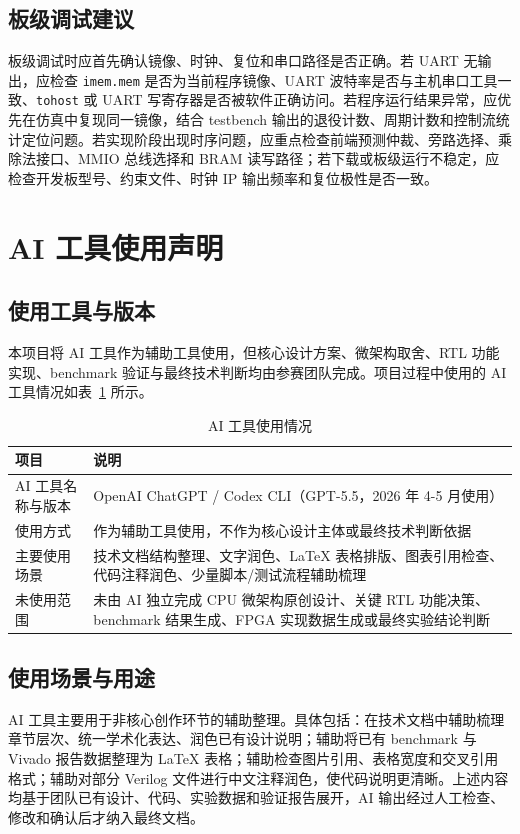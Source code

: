 ﻿\documentclass[12pt,a4paper]{ctexart}
\begin{document}
\subsection{板级调试建议}
板级调试时应首先确认镜像、时钟、复位和串口路径是否正确。若 UART 无输出，应检查 \texttt{imem.mem} 是否为当前程序镜像、UART 波特率是否与主机串口工具一致、\texttt{tohost} 或 UART 写寄存器是否被软件正确访问。若程序运行结果异常，应优先在仿真中复现同一镜像，结合 testbench 输出的退役计数、周期计数和控制流统计定位问题。若实现阶段出现时序问题，应重点检查前端预测仲裁、旁路选择、乘除法接口、MMIO 总线选择和 BRAM 读写路径；若下载或板级运行不稳定，应检查开发板型号、约束文件、时钟 IP 输出频率和复位极性是否一致。

\section{AI 工具使用声明}

\subsection{使用工具与版本}
本项目将 AI 工具作为辅助工具使用，但核心设计方案、微架构取舍、RTL 功能实现、benchmark 验证与最终技术判断均由参赛团队完成。项目过程中使用的 AI 工具情况如表~\ref{tab:ai_tool_usage} 所示。

\begin{table}[H]
    \centering
    \caption{AI 工具使用情况}
    \label{tab:ai_tool_usage}
    \begin{tabularx}{\textwidth}{lX}
        \toprule
        项目 & 说明 \\
        \midrule
        AI 工具名称与版本 & OpenAI ChatGPT / Codex CLI（GPT-5.5，2026 年 4-5 月使用） \\
        使用方式 & 作为辅助工具使用，不作为核心设计主体或最终技术判断依据 \\
        主要使用场景 & 技术文档结构整理、文字润色、LaTeX 表格排版、图表引用检查、代码注释润色、少量脚本/测试流程辅助梳理 \\
        未使用范围 & 未由 AI 独立完成 CPU 微架构原创设计、关键 RTL 功能决策、benchmark 结果生成、FPGA 实现数据生成或最终实验结论判断 \\
        \bottomrule
    \end{tabularx}
\end{table}

\subsection{使用场景与用途}
AI 工具主要用于非核心创作环节的辅助整理。具体包括：在技术文档中辅助梳理章节层次、统一学术化表达、润色已有设计说明；辅助将已有 benchmark 与 Vivado 报告数据整理为 LaTeX 表格；辅助检查图片引用、表格宽度和交叉引用格式；辅助对部分 Verilog 文件进行中文注释润色，使代码说明更清晰。上述内容均基于团队已有设计、代码、实验数据和验证报告展开，AI 输出经过人工检查、修改和确认后才纳入最终文档。
\end{document}
